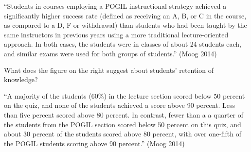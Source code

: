 \begin{answer}[6em]
\small
``Students in courses employing a POGIL instructional strategy achieved a significantly higher success rate (defined as receiving an A, B, or C in the course, as compared to a D, F or withdrawal) than students who had been taught by the same instructors in previous years using a more traditional lecture-oriented approach.
In both cases, the students were in classes of about 24 students each, and similar exams were used for both groups of students.'' (Moog 2014)
\end{answer}


\Q What does the figure on the right suggest about students' retention of knowledge?

\begin{answer}[6em]
\small
``A majority of the students (60\%) in the lecture section scored below 50 percent on the quiz, and none of the students achieved a score above 90 percent.
Less than five percent scored above 80 percent.
In contrast, fewer than a a quarter of the students from the POGIL section scored below 50 percent on this quiz, and about 30 percent of the students scored above 80 percent, with over one-fifth of the POGIL
students scoring above 90 percent.'' (Moog 2014)
\end{answer}
